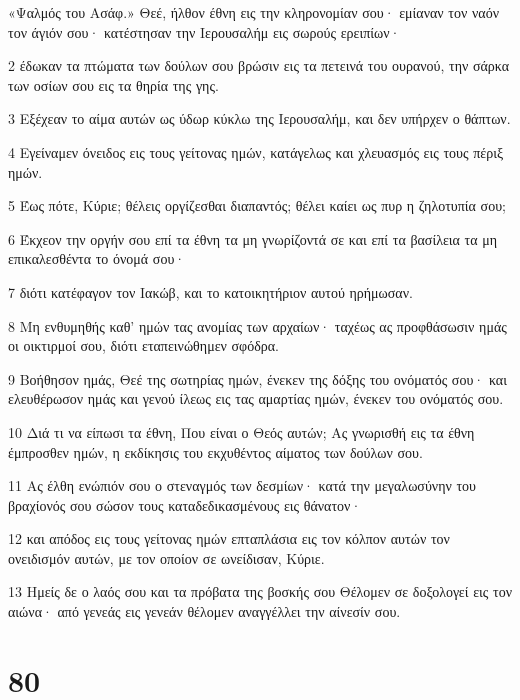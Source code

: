 \par «Ψαλμός του Ασάφ.» Θεέ, ήλθον έθνη εις την κληρονομίαν σου· εμίαναν τον ναόν τον άγιόν σου· κατέστησαν την Ιερουσαλήμ εις σωρούς ερειπίων·
\par 2 έδωκαν τα πτώματα των δούλων σου βρώσιν εις τα πετεινά του ουρανού, την σάρκα των οσίων σου εις τα θηρία της γης.
\par 3 Εξέχεαν το αίμα αυτών ως ύδωρ κύκλω της Ιερουσαλήμ, και δεν υπήρχεν ο θάπτων.
\par 4 Εγείναμεν όνειδος εις τους γείτονας ημών, κατάγελως και χλευασμός εις τους πέριξ ημών.
\par 5 Έως πότε, Κύριε; θέλεις οργίζεσθαι διαπαντός; θέλει καίει ως πυρ η ζηλοτυπία σου;
\par 6 Έκχεον την οργήν σου επί τα έθνη τα μη γνωρίζοντά σε και επί τα βασίλεια τα μη επικαλεσθέντα το όνομά σου·
\par 7 διότι κατέφαγον τον Ιακώβ, και το κατοικητήριον αυτού ηρήμωσαν.
\par 8 Μη ενθυμηθής καθ' ημών τας ανομίας των αρχαίων· ταχέως ας προφθάσωσιν ημάς οι οικτιρμοί σου, διότι εταπεινώθημεν σφόδρα.
\par 9 Βοήθησον ημάς, Θεέ της σωτηρίας ημών, ένεκεν της δόξης του ονόματός σου· και ελευθέρωσον ημάς και γενού ίλεως εις τας αμαρτίας ημών, ένεκεν του ονόματός σου.
\par 10 Διά τι να είπωσι τα έθνη, Που είναι ο Θεός αυτών; Ας γνωρισθή εις τα έθνη έμπροσθεν ημών, η εκδίκησις του εκχυθέντος αίματος των δούλων σου.
\par 11 Ας έλθη ενώπιόν σου ο στεναγμός των δεσμίων· κατά την μεγαλωσύνην του βραχίονός σου σώσον τους καταδεδικασμένους εις θάνατον·
\par 12 και απόδος εις τους γείτονας ημών επταπλάσια εις τον κόλπον αυτών τον ονειδισμόν αυτών, με τον οποίον σε ωνείδισαν, Κύριε.
\par 13 Ημείς δε ο λαός σου και τα πρόβατα της βοσκής σου Θέλομεν σε δοξολογεί εις τον αιώνα· από γενεάς εις γενεάν θέλομεν αναγγέλλει την αίνεσίν σου.

\chapter{80}

